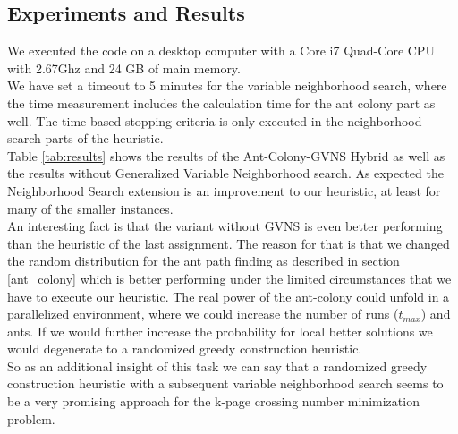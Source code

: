 \documentclass{scrartcl}
\begin{document}
\subsection{Experiments and Results}
We executed the code on a desktop computer with a Core i7 Quad-Core
CPU with 2.67Ghz and 24 GB of main memory. \\


We have set a timeout to 5 minutes for the variable neighborhood
search, where the time measurement includes the calculation time for
the ant colony part as well.  The time-based stopping criteria is only
executed in the neighborhood search parts of the heuristic.\\

Table \ref{tab:results} shows the results of the Ant-Colony-GVNS
Hybrid as well as the results without Generalized Variable
Neighborhood search.  As expected the Neighborhood Search extension is
an improvement to our heuristic, at least for many of the smaller instances. \\

An interesting fact is that the variant without GVNS is even better
performing than the heuristic of the last assignment. The reason for
that is that we changed the random distribution for the ant path
finding as described in section \ref{ant_colony} which is better
performing under the limited circumstances that we have to execute our
heuristic. The real power of the ant-colony could unfold in a
parallelized environment, where we could increase the number of runs
($t_{max}$) and ants.  If we would further increase the probability
for local better solutions we would degenerate to a randomized greedy
construction heuristic. \\

So as an additional insight of this task we can say that a randomized
greedy construction heuristic with a subsequent variable neighborhood
search seems to be a very promising approach for the k-page crossing
number minimization problem.
\end{document}
